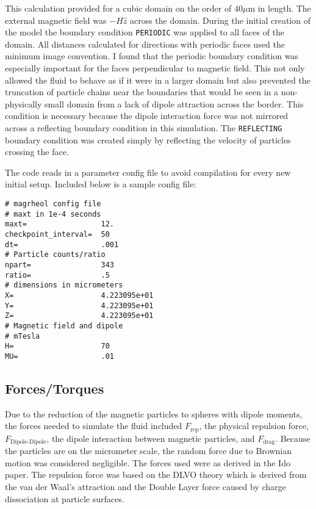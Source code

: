 This calculation provided for a cubic domain on the order of $40 \mu$m
in length.  The external magnetic field was $- H\hat z$ across the
domain. During the initial creation of the model the boundary
condition {\tt PERIODIC} was applied to all faces of the domain.  All
distances calculated for directions with periodic faces used the
minimum image convention. I found that the periodic boundary condition
was especially important for the faces perpendicular to magnetic
field.  This not only allowed the fluid to behave as if it were in a
larger domain but also prevented the truncation of particle chains
near the boundaries that would be seen in a non-physically small
domain from a lack of dipole attraction across the border. This
condition is necessary because the dipole interaction force was not
mirrored across a reflecting boundary condition in this
simulation. The {\tt REFLECTING} boundary condition was created simply
by reflecting the velocity of particles crossing the face. 

The code reads in a parameter config file to avoid compilation for every new
initial setup. Included below is a sample config file:
\begin{verbatim}
# magrheol config file
# maxt in 1e-4 seconds
maxt=                 12.
checkpoint_interval=  50
dt=                   .001
# Particle counts/ratio
npart=                343
ratio=                .5
# dimensions in micrometers
X=                    4.223095e+01
Y=                    4.223095e+01
Z=                    4.223095e+01
# Magnetic field and dipole
# mTesla
H=                    70
MU=                   .01
\end{verbatim}


\subsection*{Forces/Torques}

Due to the reduction of the magnetic particles to spheres with dipole
moments, the forces needed to simulate the fluid included
$F_\text{rep}$, the physical repulsion force,
$F_\text{Dipole-Dipole}$, the dipole interaction between magnetic
particles, and $F_\text{drag}$. Because the particles are on the
micrometer scale, the random force due to Brownian motion was
considered negligible. The forces used were as derived in the Ido
paper\cite{1}. The repulsion force was based on the DLVO theory which
is derived from the van der Waal's attraction and the Double Layer
force caused by charge dissociation at particle surfaces. 

